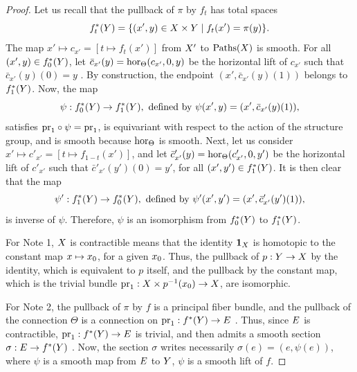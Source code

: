 \begin{proof}
  Let us recall that the pullback of $\pi$ by $f_t$ has total spaces
  $$%
  f_t^*(\Y) = \{ (x',y) \in \X \times \Y \mid f_t(x') = \pi(y) \}.
  $$%
  The map $x' \mapsto c_{x'} = [t \mapsto f_t(x')]$ from $X'$ to $\operatorname{Paths}(X)$ is smooth.
  For all $(x',y) \in f_0^*(Y)$,
  let $\bar c_{x'}(y) = \operatorname{hor}_\Theta(c_{x'},0,y)$ be the horizontal lift of $c_{x'}$ such that $\bar c_{x'}(y)(0) = y$ .
  By construction,
  the endpoint $(x',\bar c_{x'}(y)(1))$ belongs to $f_1^*(Y)$.
  Now,
  the map
  $$%
  \psi : f_0^*(\Y) \to f_1^*(\Y), \ \text{defined by} \ \psi(x',y) = (x',\bar c_{x'}(y)(1)),
  $$%
  satisfies $\mathrm{pr}_1 \circ \psi = \mathrm{pr}_1$,
  is equivariant with respect to the action of the structure group,
  and is smooth because $\operatorname{hor}_\Theta$ is smooth.
  Next,
  let us consider $x' \mapsto c'_{x'} = [t \mapsto f_{1-t}(x')]$,
  and let $\bar c'_{x'}(y) = \operatorname{hor}_\Theta(c'_{x'},0,y')$ be the horizontal lift of $c'_{x'}$ such that $\bar c'_{x'}(y')(0) = y'$,
  for all $(x',y') \in f_1^*(Y)$.
  It is then clear that the map
  $$%
  \psi' : f_1^*(\Y) \to f_0^*(\Y), \ \text{defined by} \ \psi'(x',y') = (x',\bar c'_{x'}(y')(1)),
  $$%
  is inverse of $\psi$.
  Therefore,
  $\psi$ is an isomorphism from $f_0^*(Y)$ to $ f_1^*(Y)$.
  
  For Note 1, $X$ is contractible means that the identity ${\bf 1}_X$ is homotopic to the constant map $x \mapsto {x_0}$,
  for a given ${x_0}$.
  Thus,
  the pullback of $p : Y \to X$ by the identity,
  which is equivalent to $p$ itself,
  and the pullback by the constant map,
  which is the trivial bundle $\mathrm{pr}_1 : X \times p^{-1}({x_0}) \to X$,
  are isomorphic.
  
  For Note 2, the pullback of $\pi$ by $f$ is a principal fiber bundle,
  and the pullback of the connection $\Theta$ is a connection on $\mathrm{pr}_1 : f^*(Y) \to E$ .
  Thus,
  since $E$ is contractible,
  $\mathrm{pr}_1 : f^*(Y) \to E$ is trivial,
  and then admits a smooth section $\sigma : E \to f^*(Y)$ .
  Now,
  the section $\sigma$ writes necessarily $\sigma(e) = (e,\psi(e))$,
  where $\psi$ is a smooth map from $E$ to $Y$,
  $\psi$ is a smooth lift of $f$.
\end{proof}

